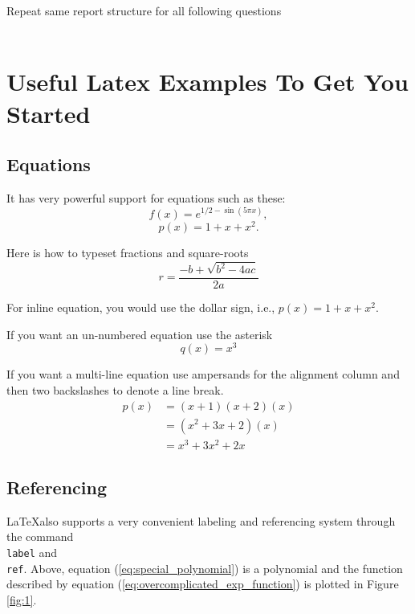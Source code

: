 \documentclass[12pt]{article}
\begin{document}
Repeat same report structure for all following questions\\\\


\section*{Useful Latex Examples To Get You Started}

\subsection{Equations}
It has very powerful support for equations such as these:
\begin{equation}
f(x) = e^{1/2 - \sin(5 \pi    x)}, \label{eq:overcomplicated_exp_function} 
\end{equation}
\begin{equation}
p(x) = 1+x+x^2. \label{eq:special_polynomial} 
\end{equation}

\noindent
Here is how to typeset fractions and square-roots
\begin{equation}
    r = \frac{-b + \sqrt{b^2 - 4ac}}{2a}
\end{equation}

\noindent
For inline equation, you would use the dollar sign, i.e., $p(x) = 1 + x + x^2$.

\noindent
If you want an un-numbered equation use the asterisk
\begin{equation*}
    q(x) = x^3
\end{equation*}

\noindent
If you want a multi-line equation use ampersands for the alignment column and then two backslashes to denote a line break.
\begin{align}
   p(x) & = (x + 1)(x + 2)(x) \\
        & = (x^2 + 3x + 2)(x) \\
        & = x^3 + 3x^2 + 2x
\end{align}

\subsection{Referencing}
\LaTeX also supports a very convenient labeling and referencing system
through the command \texttt{\\label} and \texttt{\\ref}.  Above, equation
(\ref{eq:special_polynomial}) is a polynomial and the function described by equation
(\ref{eq:overcomplicated_exp_function}) is plotted in Figure \ref{fig:1}. 
\end{document}
